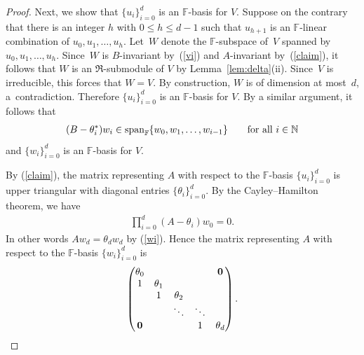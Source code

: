 \documentclass[pdftex]{sigma}
\def\N{\mathbb N}
\def\F{\mathbb F}
\numberwithin{equation}{section}
\begin{document}
\begin{proof}
Next, we show that $\{u_i\}_{i=0}^d$ is an $\F$-basis for $V$. Suppose on the contrary that there is an integer $h$ with $0\leq h\leq d-1$ such that $u_{h+1}$ is an $\F$-linear combination of $u_0,u_1,\ldots,u_h$. Let~$W$ denote the $\F$-subspace of~$V$ spanned by $u_0,u_1,\ldots,u_h$.
Since~$W$ is $B$-invariant by~(\ref{vi}) and $A$-invariant by~(\ref{claim}), it follows that $W$ is an $\Re$-submodule of $V$ by Lemma~\ref{lem:delta}(ii). Since~$V$ is irreducible, this forces that $W=V$.
By construction, $W$ is of dimension at most~$d$, a~contradiction. Therefore $\{u_i\}_{i=0}^d$ is an $\F$-basis for $V$.
By a similar argument, it follows that
\begin{gather}\label{claim'}
(B-\theta_i^*) w_i\in \operatorname{span}_\F\{w_0,w_1,\ldots,w_{i-1}\}\qquad \hbox{for all $i\in \N$}
\end{gather}
and $\{w_i\}_{i=0}^d$ is an $\F$-basis for $V$.

By (\ref{claim}), the matrix representing $A$ with respect to the $\F$-basis $\{u_i\}_{i=0}^d$ is upper triangular with diagonal entries $\{\theta_i\}_{i=0}^d$. By the Cayley--Hamilton theorem, we have
\begin{gather}\label{CH}
\prod\limits_{i=0}^d (A-\theta_i) w_0=0.
\end{gather}
In other words $Aw_d=\theta_d w_d$ by (\ref{wi}). Hence the matrix representing $A$ with respect to the $\F$-basis $\{w_i\}_{i=0}^d$ is
\begin{gather*}
\begin{pmatrix}
\theta_0 & & & &{\bf 0}
\\
1 &\theta_1
\\
&1 &\theta_2
 \\
& &\ddots &\ddots
 \\
{\bf 0} & & &1 &\theta_d
\end{pmatrix}.
\end{gather*}


\end{proof}
\end{document}
